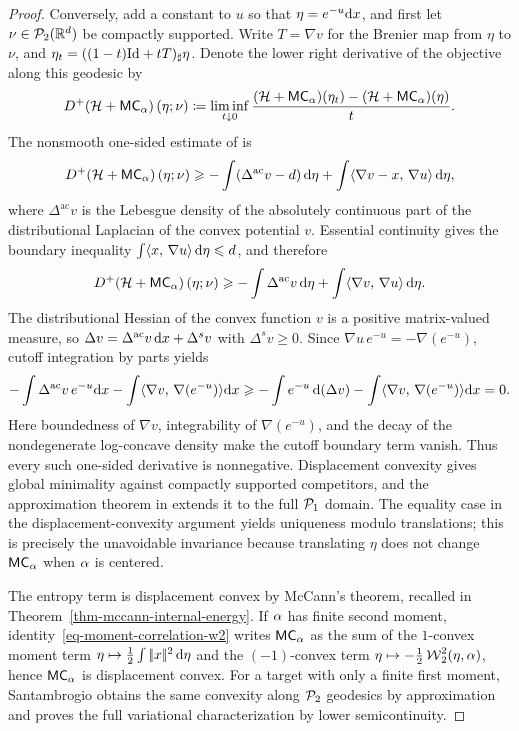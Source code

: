\begin{proof}
Conversely, add a constant to \(u\) so that \(\eta=e^{-u}\mathrm{d} x\), and first let \(\nu\in\mathcal{P}_2(\mathbb{R}^d)\) be compactly supported. Write \(T=\nabla v\) for the Brenier map from \(\eta\) to \(\nu\), and \(\eta_t=((1-t)\mathrm{Id}+tT)_\sharp\eta\). Denote the lower right derivative of the objective along this geodesic by
\[
D^+\!\left(\mathcal H+\mathsf{MC}_\alpha\right)(\eta;\nu)
\coloneqq
\liminf_{t\downarrow0}
\frac{(\mathcal H+\mathsf{MC}_\alpha)(\eta_t)-(\mathcal H+\mathsf{MC}_\alpha)(\eta)}{t}.
\]
The nonsmooth one-sided estimate of is
\[
D^+\!\left(\mathcal H+\mathsf{MC}_\alpha\right)(\eta;\nu)
\geqslant
-\int(\Delta^{\mathrm{ac}}v-d)\,\mathrm{d}\eta
+\int\langle \nabla v-x,\,\nabla u\rangle\,\mathrm{d}\eta,
\]
where \(\Delta^{\mathrm{ac}}v\) is the Lebesgue density of the absolutely continuous part of the distributional Laplacian of the convex potential \(v\). Essential continuity gives the boundary inequality
\(\int\langle x,\,\nabla u\rangle\,\mathrm{d}\eta\leqslant d\), and therefore
\[
D^+\!\left(\mathcal H+\mathsf{MC}_\alpha\right)(\eta;\nu)
\geqslant
-\int\Delta^{\mathrm{ac}}v\,\mathrm{d}\eta
+\int\langle \nabla v,\,\nabla u\rangle\,\mathrm{d}\eta.
\]
The distributional Hessian of the convex function \(v\) is a positive matrix-valued measure, so
\(\Delta v=\Delta^{\mathrm{ac}}v\,\mathrm{d} x+\Delta^s v\) with \(\Delta^s v\geq0\). Since \(\nabla u\,e^{-u}=-\nabla(e^{-u})\), cutoff integration by parts yields
\[
-\int\Delta^{\mathrm{ac}}v\,e^{-u}\mathrm{d} x
-\int\langle \nabla v,\,\nabla(e^{-u})\rangle\mathrm{d} x
\geqslant
-\int e^{-u}\,\mathrm{d}(\Delta v)
-\int\langle \nabla v,\,\nabla(e^{-u})\rangle\mathrm{d} x
=0.
\]
Here boundedness of \(\nabla v\), integrability of \(\nabla(e^{-u})\), and the decay of the nondegenerate log-concave density make the cutoff boundary term vanish. Thus every such one-sided derivative is nonnegative. Displacement convexity gives global minimality against compactly supported competitors, and the approximation theorem in extends it to the full \(\mathcal{P}_1\) domain. The equality case in the displacement-convexity argument yields uniqueness modulo translations; this is precisely the unavoidable invariance because translating \(\eta\) does not change \(\mathsf{MC}_\alpha\) when \(\alpha\) is centered.

The entropy term is displacement convex by McCann's theorem, recalled in Theorem~\ref{thm-mccann-internal-energy}. If $\alpha$ has finite second moment, identity~\eqref{eq-moment-correlation-w2} writes $\mathsf{MC}_\alpha$ as the sum of the $1$-convex moment term $\eta\mapsto\frac12\int|\!| x |\!|^2\,\mathrm{d}\eta$ and the $(-1)$-convex term $\eta\mapsto-\frac12\operatorname{\mathcal{W}}_2^2(\eta,\alpha)$, hence $\mathsf{MC}_\alpha$ is displacement convex. For a target with only a finite first moment, Santambrogio obtains the same convexity along $\mathcal{P}_2$ geodesics by approximation and proves the full variational characterization by lower semicontinuity.
\end{proof}
